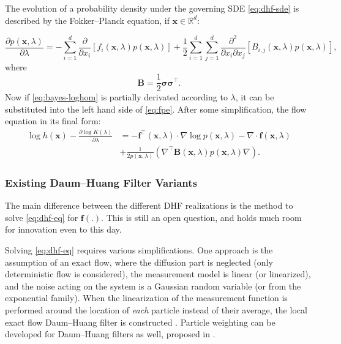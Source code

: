 The evolution of a probability density under the governing SDE \eqref{eq:dhf-sde} is described by the Fokker--Planck equation, if $\mathbf{x} \in \mathbb{R}^d$:

\begin{equation}\label{eq:fpe}
  \frac{\partial p(\mathbf{x},\lambda)}{\partial \lambda} = -\sum_{i = 1}^{d}\frac{\partial}{\partial x_i}\left[f_i(\mathbf{x},\lambda)p(\mathbf{x},\lambda)\right] + \frac{1}{2}\sum_{i = 1}^{d}\sum_{j = 1}^{d}\frac{\partial^2}{\partial x_i \partial x_j}\left[B_{i,j}(\mathbf{x},\lambda)p(\mathbf{x},\lambda)\right],
\end{equation}
where
\begin{equation}\label{key}
  \mathbf{B} = \frac{1}{2}\boldsymbol\sigma\boldsymbol\sigma^\top.
\end{equation}
Now if \eqref{eq:bayes-loghom} is partially derivated according to $\lambda$, it can be substituted into the left hand side of \eqref{eq:fpe}. After some simplification, the flow equation in its final form:
\begin{align}\label{eq:dhf-eq}
  \log h(\mathbf{x}) - \frac{\partial \log K(\lambda)}{\partial \lambda} & = -\mathbf{f}^\top(\mathbf{x},\lambda)\cdot\nabla\log p(\mathbf{x},\lambda) - \nabla\cdot \mathbf{f}(\mathbf{x},\lambda)       \\
                                                                         & + \frac{1}{2p(\mathbf{x},\lambda)}\left(\nabla^\top\mathbf{B}(\mathbf{x},\lambda)p(\mathbf{x},\lambda)\nabla\right). \nonumber
\end{align}

\subsubsection{Existing Daum--Huang Filter Variants}
The main difference between the different DHF realizations is the method to solve \eqref{eq:dhf-eq} for $\mathbf{f}(.)$. This is still an open question, and holds much room for innovation even to this day.

Solving \eqref{eq:dhf-eq} requires various simplifications. One approach is the assumption of an exact flow, where the diffusion part is neglected (only deterministic flow is considered), the measurement model is linear (or linearized), and the noise acting on the system is a Gaussian random variable (or from the exponential family). When the linearization of the measurement function is performed around the location of \emph{each} particle instead of their average, the local exact flow Daum--Huang filter is constructed \cite{Ding2012}. Particle weighting can be developed for Daum--Huang filters as well, proposed in \cite{Li2016}.

